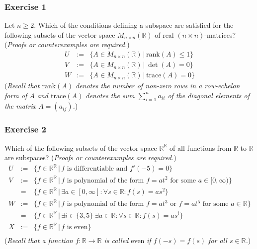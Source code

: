 \documentclass[
  12pt,
  a4paper,
  twoside]{article}
\theoremstyle{plain}
\theoremstyle{definition}
\begin{document}
\hypertarget{exercise-1-4}{%
\subsubsection*{Exercise 1}\label{exercise-1-4}}

Let \(n \ge 2\). Which of the conditions defining a subspace are
satisfied for the following subsets of the vector space
\(M_{n\times n}(\mathbb{R})\) of real \((n\times n)\)-matrices?
(\emph{Proofs or counterexamples are required.})
\begin{eqnarray*}
U& := &\{A \in M_{n \times n}(\mathbb{R})\, | \,\textrm{rank}(A) \le 1\}\\
V& := & \{A \in M_{n \times n}(\mathbb{R})\, | \,\det(A) = 0\}\\
W& := & \{A \in M_{n \times n}(\mathbb{R})\, |\, \textrm{trace}(A) = 0\}
\end{eqnarray*}
(\emph{Recall that \(\textrm{rank}(A)\) denotes the number of non-zero rows in a
row-echelon form of \(A\) and \(\textrm{trace}(A)\) denotes the sum \(\sum_{i=1}^n a_{ii}\) of the diagonal elements of the matrix \(A = (a_{ij})\).})

\hypertarget{exercise-2-4}{%
\subsubsection*{Exercise 2}\label{exercise-2-4}}

Which of the following subsets of the vector space \(\mathbb{R}^{\mathbb{R}}\)
of all functions from \(\mathbb{R}\) to \(\mathbb{R}\) are subspaces?
(\emph{Proofs or counterexamples are required.})
\begin{eqnarray*}
U& := & \{f \in \mathbb{R}^{\mathbb{R}}\, | \,f \textrm{ is differentiable and } f'(-5)=0\}\\
V&:= & \{f \in \mathbb{R}^\mathbb{R} \,|\, f \textrm{ is polynomial of the form } f = at^2 \textrm{ for some } a \in [0,\infty)\}\\ &= &\{f \in \mathbb{R}^\mathbb{R} \,|\, \exists a \in [0,\infty] : \forall s \in \mathbb{R} : f(s) = a s^2\}\\
W&:= & \{f \in \mathbb{R}^\mathbb{R} \,| \,f \textrm{ is polynomial of the form } f = a t^3 \textrm{ or } f = at^5 \textrm{ for some } a \in \mathbb{R}\}\\ & = &\{f \in \mathbb{R}^\mathbb{R}\, | \,\exists i \in \{3,5\}\; \exists a \in \mathbb{R} : \forall s \in \mathbb{R} : f(s) = a s^i\}\\
X& := & \{f \in \mathbb{R}^\mathbb{R} \,|\, f \textrm{ is even}\}\\
\end{eqnarray*}
(\emph{Recall that a function \(f:\mathbb{R} \rightarrow \mathbb{R}\) is called} even \emph{if \(f(-s) = f(s)\) for all \(s \in \mathbb{R}\).})
\end{document}

